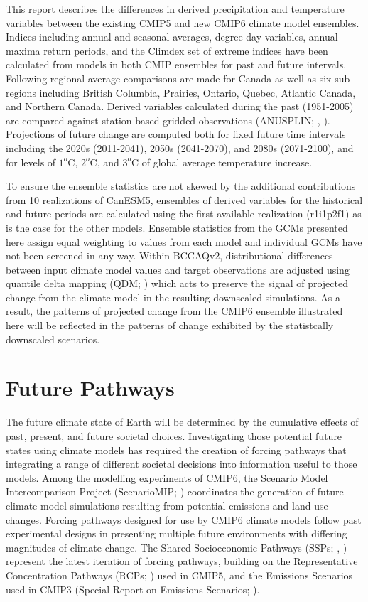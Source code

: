 \documentclass[]{scrartcl}
\begin{document}
This report describes the differences in derived precipitation and temperature variables between the existing CMIP5 and new CMIP6 climate model ensembles. Indices including annual and seasonal averages, degree day variables, annual maxima return periods, and the Climdex set of extreme indices \citep{Zhang2011} have been calculated from models in both CMIP ensembles for past and future intervals. Following \cite{zhang_change_2019} regional average comparisons are made for Canada as well as six sub-regions including British Columbia, Prairies, Ontario, Quebec, Atlantic Canada, and Northern Canada. Derived variables calculated during the past (1951-2005) are compared against station-based gridded observations (ANUSPLIN; \citealt{Hopkinson2012}, \citealt{McKenney2011}). Projections of future change are computed both for fixed future time intervals including the 2020s (2011-2041), 2050s (2041-2070), and 2080s (2071-2100), and for levels of $1^o$C, $2^o$C, and $3^o$C of global average temperature increase. 

To ensure the ensemble statistics are not skewed by the additional contributions from 10 realizations of CanESM5, ensembles of derived variables for the historical and future periods are calculated using the first available realization (r1i1p2f1) as is the case for the other models. Ensemble statistics from the GCMs presented here assign equal weighting to values from each model and individual GCMs have not been screened in any way. Within BCCAQv2, distributional differences between input climate model values and target observations are adjusted using quantile delta mapping (QDM; \citealt{cannon_bias_2015}) which acts to preserve the signal of projected change from the climate model in the resulting downscaled simulations. As a result, the patterns of projected change from the CMIP6 ensemble illustrated here will be reflected in the patterns of change exhibited by the statistcally downscaled scenarios. 

\section{Future Pathways}
The future climate state of Earth will be determined by the cumulative effects of past, present, and future societal choices. Investigating those potential future states using climate models has required the creation of forcing pathways that integrating a range of different societal decisions into information useful to those models. Among the modelling experiments of CMIP6, the Scenario Model Intercomparison Project (ScenarioMIP; \citealt{oneill_scenario_2016}) coordinates the generation of future climate model simulations resulting from potential emissions and land-use changes. Forcing pathways designed for use by CMIP6 climate models follow past experimental designs in presenting multiple future environments with differing magnitudes of climate change. The Shared Socioeconomic Pathways (SSPs; \citealt{gidden_global_2019}, \citealt{Riahi2017}) represent the latest iteration of forcing pathways, building on the Representative Concentration Pathways (RCPs; \citealt{Vuuren2011}) used in CMIP5, and the Emissions Scenarios used in CMIP3 (Special Report on Emissions Scenarios; \citealt{Nakicenovic2000}). 
 
\end{document}
